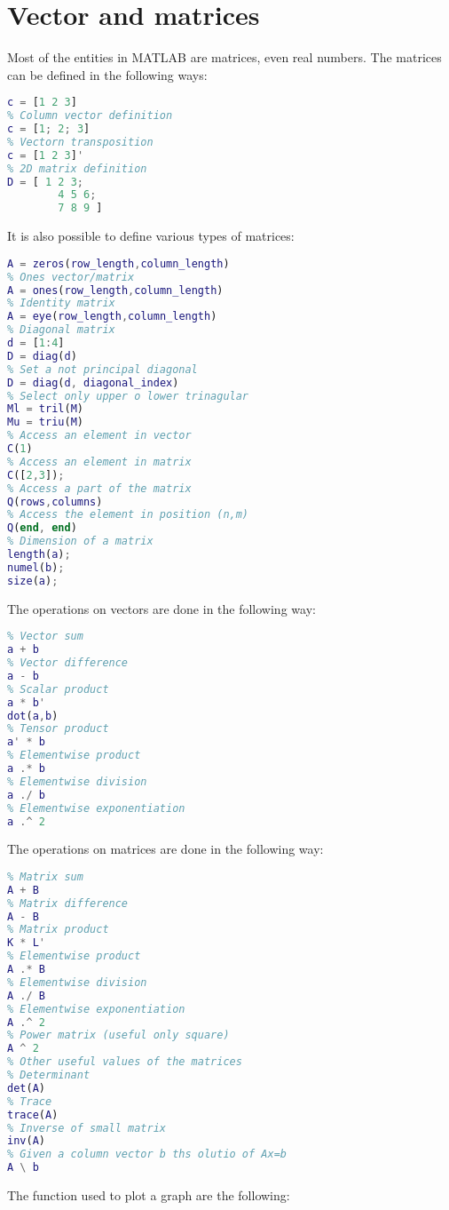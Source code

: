 \documentclass[12pt, a4paper]{report}
\newtheorem[style=M,bodystyle=\normalfont]{theorem}{Theorem}
\newtheorem[style=M,bodystyle=\normalfont]{corollary}{Corollary}
\newtheorem[style=M,bodystyle=\normalfont]{lemma}{Lemma}
\newtheorem[style=M,bodystyle=\normalfont]{definition}{Definition}
\begin{document}
    \section{Vector and matrices}
    Most of the entities in MATLAB are matrices, even real numbers. The matrices can be defined in the following ways: 
    \begin{lstlisting}[language=Matlab]
% Row vector definition
c = [1 2 3]
% Column vector definition
c = [1; 2; 3]
% Vectorn transposition
c = [1 2 3]'
% 2D matrix definition
D = [ 1 2 3; 
        4 5 6; 
        7 8 9 ]
    \end{lstlisting}
    It is also possible to define various types of matrices: 
    \begin{lstlisting}[language=Matlab]
% Zeros vector/matrix
A = zeros(row_length,column_length)	
% Ones vector/matrix
A = ones(row_length,column_length)	
% Identity matrix
A = eye(row_length,column_length)   
% Diagonal matrix
d = [1:4]
D = diag(d)
% Set a not principal diagonal 
D = diag(d, diagonal_index)
% Select only upper o lower trinagular
Ml = tril(M)
Mu = triu(M)
% Access an element in vector
C(1)
% Access an element in matrix
C([2,3]);
% Access a part of the matrix
Q(rows,columns)    
% Access the element in position (n,m)
Q(end, end)   
% Dimension of a matrix
length(a);
numel(b);
size(a);
    \end{lstlisting}  
    The operations on vectors are done in the following way: 
    \begin{lstlisting}[language=Matlab]
% Given two row vectors a and b
% Vector sum
a + b    
% Vector difference
a - b   
% Scalar product
a * b'      
dot(a,b)   
% Tensor product
a' * b      
% Elementwise product
a .* b  
% Elementwise division    
a ./ b  
% Elementwise exponentiation    
a .^ 2      
    \end{lstlisting}  
    The operations on matrices are done in the following way: 
    \begin{lstlisting}[language=Matlab]
% Givcen two matrices A and B (both 3x2)
% Matrix sum
A + B
% Matrix difference
A - B
% Matrix product
K * L'
% Elementwise product
A .* B
% Elementwise division
A ./ B      
% Elementwise exponentiation
A .^ 2      
% Power matrix (useful only square)
A ^ 2         
% Other useful values of the matrices
% Determinant
det(A)
% Trace
trace(A)  
% Inverse of small matrix      
inv(A)          
% Given a column vector b ths olutio of Ax=b
A \ b       
    \end{lstlisting}  
    The function used to plot a graph are the following: 
\end{document}
